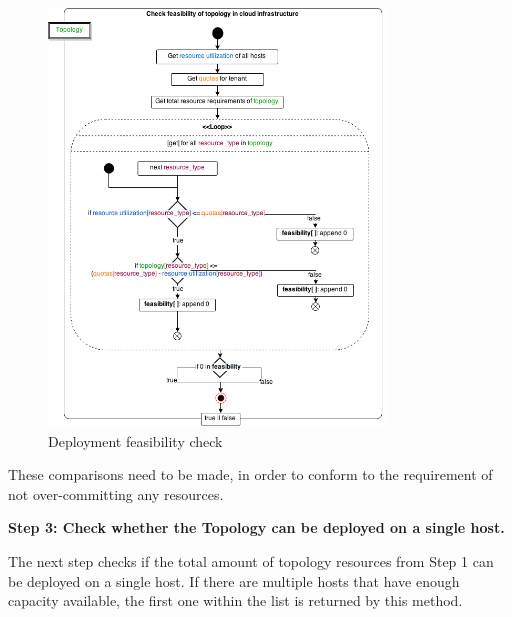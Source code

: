 \begin{figure}[H]
\centering

\includegraphics[width=0.8\textwidth]{images/implementation/cm_feasibility_check}

\caption{Deployment feasibility check}
\end{figure}

These comparisons need to be made, in order to conform to the requirement of not over-committing any resources.

\newpage
\textbf{Step 3: Check whether the Topology can be deployed on a single host.}

The next step checks if the total amount of topology resources from Step 1 can be deployed on a single host. If there are multiple hosts that have enough capacity available, the first one within the list is returned by this method.

